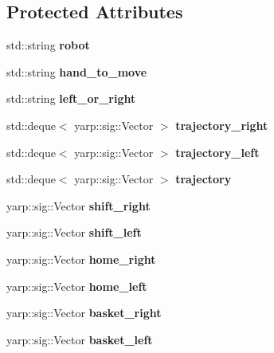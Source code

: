 \subsection*{Protected Attributes}
\begin{DoxyCompactItemize}
\item 
std\+::string {\bfseries robot}\label{classGraspExecution_add1ccc7979dfd444774874ef45acfbef}

\item 
std\+::string {\bfseries hand\+\_\+to\+\_\+move}\label{classGraspExecution_af8666e0e45d0a8f41d494bf7d5fab41d}

\item 
std\+::string {\bfseries left\+\_\+or\+\_\+right}\label{classGraspExecution_acfb5fa41f061241d0340c3127d445424}

\item 
std\+::deque$<$ yarp\+::sig\+::\+Vector $>$ {\bfseries trajectory\+\_\+right}\label{classGraspExecution_abe1a87e13aeb08a0b0a76c5627221638}

\item 
std\+::deque$<$ yarp\+::sig\+::\+Vector $>$ {\bfseries trajectory\+\_\+left}\label{classGraspExecution_ad322d77c2ef8fac21c352d1f3fe31038}

\item 
std\+::deque$<$ yarp\+::sig\+::\+Vector $>$ {\bfseries trajectory}\label{classGraspExecution_a406d5c4ebc26f79b7a30af4854bbda48}

\item 
yarp\+::sig\+::\+Vector {\bfseries shift\+\_\+right}\label{classGraspExecution_a1baf57f3fabc9fd56eec77facb4bf478}

\item 
yarp\+::sig\+::\+Vector {\bfseries shift\+\_\+left}\label{classGraspExecution_af2e560a2d96db54461f13fdab0b47954}

\item 
yarp\+::sig\+::\+Vector {\bfseries home\+\_\+right}\label{classGraspExecution_af020ee42122eed4eae529f45d4cd5a3d}

\item 
yarp\+::sig\+::\+Vector {\bfseries home\+\_\+left}\label{classGraspExecution_aeaab5ed9db8ee2bd6df59db48739976c}

\item 
yarp\+::sig\+::\+Vector {\bfseries basket\+\_\+right}\label{classGraspExecution_a482fb65886a13e0a88a15764047fc65b}

\item 
yarp\+::sig\+::\+Vector {\bfseries basket\+\_\+left}\label{classGraspExecution_a1a28ab6787ec253f78675ffc7db46f5a}


\end{DoxyCompactItemize}
